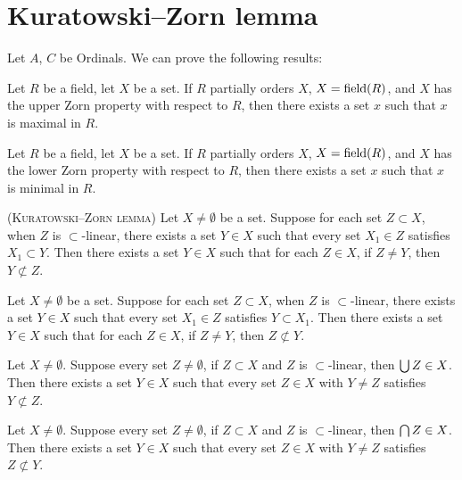 \documentclass{article}
\begin{document}
\section{Kuratowski--Zorn lemma}

Let $A$, $C$ be Ordinals. We can prove the following results:
\begin{thm}
\item\label{orders1:63} Let $R$ be a field, let $X$ be a set.
  If $R$ partially orders $X$, $X = \operatorname{field}(R)$, and $X$ has the upper
  Zorn property with respect to $R$,
  then there exists a set $x$ such that $x$ is maximal in $R$.
\item\label{orders1:64} Let $R$ be a field, let $X$ be a set.
  If $R$ partially orders $X$, $X = \operatorname{field}(R)$, and $X$ has the lower
  Zorn property with respect to $R$,
  then there exists a set $x$ such that $x$ is minimal in $R$.
\item\label{orders1:65} (\textsc{Kuratowski--Zorn lemma})
  Let $X\neq\emptyset$ be a set.
  Suppose for each set $Z\subset X$, when $Z$ is $\subset$-linear,
  there exists a set $Y\in X$
  such that every set $X_{1}\in Z$ satisfies $X_{1}\subset Y$.
  Then there exists a set $Y\in X$ such that for each $Z\in X$,
  if $Z\neq Y$, then $Y\nsubset Z$.
\item\label{orders1:66} Let $X\neq\emptyset$ be a set.
  Suppose for each set $Z\subset X$, when $Z$ is $\subset$-linear,
  there exists a set $Y\in X$
  such that every set $X_{1}\in Z$ satisfies $Y\subset X_{1}$.
  Then there exists a set $Y\in X$ such that for each $Z\in X$,
  if $Z\neq Y$, then $Z\nsubset Y$.
\item\label{orders1:67} Let $X\neq\emptyset$.
  Suppose every set $Z\neq\emptyset$, if $Z\subset X$ and $Z$ is
  $\subset$-linear, then $\bigcup Z\in X$.
  Then there exists a set $Y\in X$ such that every set $Z\in X$ with
  $Y\neq Z$ satisfies $Y\nsubset Z$.
\item\label{orders1:68} Let $X\neq\emptyset$.
  Suppose every set $Z\neq\emptyset$, if $Z\subset X$ and $Z$ is
  $\subset$-linear, then $\bigcap Z\in X$.
  Then there exists a set $Y\in X$ such that every set $Z\in X$ with
  $Y\neq Z$ satisfies $Z\nsubset Y$.
\end{thm}
\end{document}
